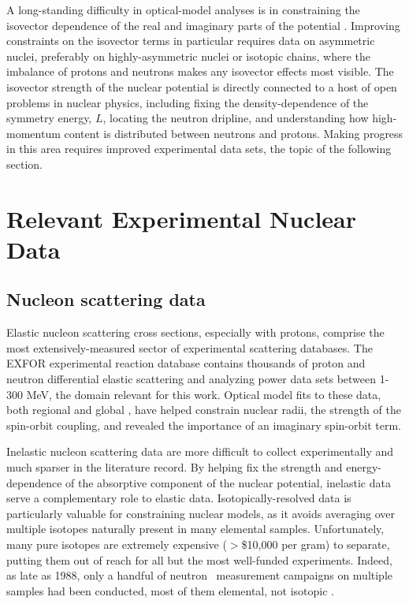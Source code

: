 A long-standing difficulty in optical-model analyses is in constraining the isovector dependence
of the real and imaginary parts of the potential \cite{Holt16, Anderson1990}. Improving constraints on the
isovector terms in particular requires data
on asymmetric nuclei, preferably on highly-asymmetric nuclei or isotopic chains,
where the imbalance of protons and neutrons makes any isovector effects most visible. The isovector
strength of the nuclear potential is directly connected to a host of open problems in nuclear physics,
including fixing the density-dependence of the symmetry energy, $L$, locating the
neutron dripline, and understanding how high-momentum content is distributed between neutrons and
protons. Making progress in this area requires improved experimental data sets, the topic of the
following section.

\section{Relevant Experimental Nuclear Data}

\subsection{Nucleon scattering data}
Elastic nucleon scattering cross sections, especially with protons, comprise the most extensively-measured
sector of experimental scattering databases. The EXFOR experimental reaction database
\cite{EXFORDatabase} contains thousands of proton and neutron
differential elastic scattering and analyzing
power data sets between 1-300 MeV, the domain relevant for this work. Optical model fits
to these data, both regional and global \cite{CH89, KoningDelaroche}, have helped
constrain nuclear radii, the strength of the spin-orbit coupling,
and revealed the importance of an imaginary spin-orbit term.

Inelastic nucleon scattering data are more difficult to collect experimentally and much sparser in
the literature record. By helping fix the strength and energy-dependence of the absorptive component
of the nuclear potential, inelastic data serve a complementary role to elastic
data.
\noindent
Isotopically-resolved data is particularly valuable for constraining nuclear
models, as it avoids averaging over multiple isotopes naturally present in many elemental samples.
Unfortunately, many pure isotopes are extremely expensive ($>$\$10,000 per gram) to
separate, putting them out of reach for all but the most well-funded experiments.
Indeed, as late as 1988, only a handful of neutron \tot\ measurement campaigns
on multiple samples had been conducted, most of them elemental, not isotopic
\cite{BarnBook1988}.

